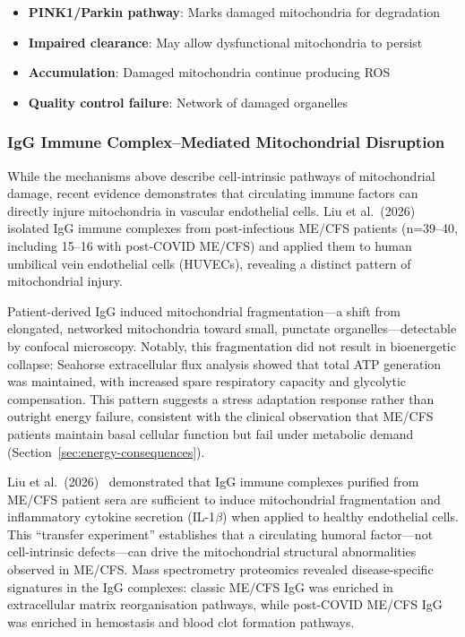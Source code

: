\begin{itemize}
    \item \textbf{PINK1/Parkin pathway}: Marks damaged mitochondria for degradation
    \item \textbf{Impaired clearance}: May allow dysfunctional mitochondria to persist
    \item \textbf{Accumulation}: Damaged mitochondria continue producing ROS
    \item \textbf{Quality control failure}: Network of damaged organelles
\end{itemize}

\subsubsection{IgG Immune Complex--Mediated Mitochondrial Disruption}
\label{sec:igg-mito-disruption}

While the mechanisms above describe cell-intrinsic pathways of mitochondrial damage, recent evidence demonstrates that circulating immune factors can directly injure mitochondria in vascular endothelial cells. Liu et al.\ (2026)~\cite{Liu2026IgGcomplexes} isolated IgG immune complexes from post-infectious ME/CFS patients (n=39--40, including 15--16 with post-COVID ME/CFS) and applied them to human umbilical vein endothelial cells (HUVECs), revealing a distinct pattern of mitochondrial injury.

Patient-derived IgG induced mitochondrial fragmentation---a shift from elongated, networked mitochondria toward small, punctate organelles---detectable by confocal microscopy. Notably, this fragmentation did not result in bioenergetic collapse: Seahorse extracellular flux analysis showed that total ATP generation was maintained, with increased spare respiratory capacity and glycolytic compensation. This pattern suggests a stress adaptation response rather than outright energy failure, consistent with the clinical observation that ME/CFS patients maintain basal cellular function but fail under metabolic demand (Section~\ref{sec:energy-consequences}).

\begin{achievement}
\label{ach:igg-mito-transfer}
Liu et al.\ (2026)~\cite{Liu2026IgGcomplexes} demonstrated that IgG immune complexes purified from ME/CFS patient sera are sufficient to induce mitochondrial fragmentation and inflammatory cytokine secretion (IL-1$\beta$) when applied to healthy endothelial cells. This ``transfer experiment'' establishes that a circulating humoral factor---not cell-intrinsic defects---can drive the mitochondrial structural abnormalities observed in ME/CFS. Mass spectrometry proteomics revealed disease-specific signatures in the IgG complexes: classic ME/CFS IgG was enriched in extracellular matrix reorganisation pathways, while post-COVID ME/CFS IgG was enriched in hemostasis and blood clot formation pathways.
\end{achievement}

